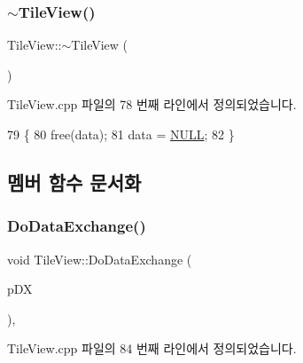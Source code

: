 \subsubsection{\texorpdfstring{$\sim$\+Tile\+View()}{~TileView()}}
{\footnotesize\ttfamily Tile\+View\+::$\sim$\+Tile\+View (\begin{DoxyParamCaption}{ }\end{DoxyParamCaption})\hspace{0.3cm}{\ttfamily [virtual]}}



Tile\+View.\+cpp 파일의 78 번째 라인에서 정의되었습니다.


\begin{DoxyCode}
79 \{
80   free(data);
81   data = \mbox{\hyperlink{getopt1_8c_a070d2ce7b6bb7e5c05602aa8c308d0c4}{NULL}};
82 \}
\end{DoxyCode}


\subsection{멤버 함수 문서화}
\mbox{\label{class_tile_view_a6c10f973f1ebbb7169bd6440572a9328}} 
\subsubsection{\texorpdfstring{Do\+Data\+Exchange()}{DoDataExchange()}}
{\footnotesize\ttfamily void Tile\+View\+::\+Do\+Data\+Exchange (\begin{DoxyParamCaption}\item[{C\+Data\+Exchange $\ast$}]{p\+DX }\end{DoxyParamCaption})\hspace{0.3cm}{\ttfamily [protected]}, {\ttfamily [virtual]}}



Tile\+View.\+cpp 파일의 84 번째 라인에서 정의되었습니다.



